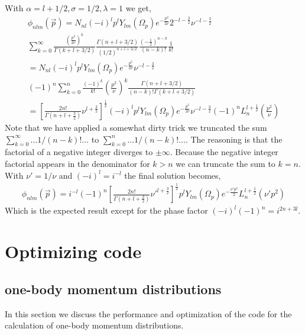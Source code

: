 \documentclass[10pt]{article}
\begin{document}
With $\alpha = l+1/2, \sigma = 1/2, \lambda = 1$ we get,
\begin{multline*}
	\phi_{n l m}(\vec{p}) = N_{nl} (-i)^{l} p^{l}  Y_{l m}(\Omega_p) e^{-\frac{p^{2}}{2 \nu}} 2^{-l-\frac{3}{2}} \nu^{-l-\frac{3}{2}} \\
	 \sum_{k=0}^{\infty}  \frac{\left( \frac{p^{2}}{2 \nu} \right)^{k}}{\Gamma(k+l+3/2)} \frac{\Gamma(n+l+3/2)}{(1/2)^{n+l+3/2}} \frac{\left(-\frac{1}{2}\right)^{n-k}}{(n-k)!} \frac{1}{k!} \\
	 = N_{nl} (-i)^{l} p^{l}  Y_{l m}(\Omega_p) e^{-\frac{p^{2}}{2 \nu}} \nu^{-l-\frac{3}{2}} \\
	 (-1)^{n} \sum_{k=0}^{n} \frac{(-1)^{k}}{k!} \left( \frac{p^{2}}{\nu} \right)^{k} \frac{\Gamma(n+l+3/2)}{(n-k)! \Gamma(k+l+3/2)} \\
	 = \left[ \frac{ 2n!}{\Gamma(n+l+\frac{3}{2})} \nu^{l+\frac{3}{2}} \right]^{\frac{1}{2}} (-i)^{l} p^{l}  Y_{l m}(\Omega_p) e^{-\frac{p^{2}}{2 \nu}} \nu^{-l-\frac{3}{2}} (-1)^{n} L_{n}^{l+\frac{1}{2}}(\frac{p^{2}}{\nu})
\end{multline*}
Note that we have applied a somewhat dirty trick we truncated the sum $\sum_{k=0}^{\infty} \ldots 1/(n-k)! \ldots$ to $ \sum_{k=0}^{n} \ldots 1/(n-k)! \ldots$. The reasoning is that the factorial of a negative integer diverges to $\pm \infty$. Because the negative integer factorial appears in the denominator for $k>n$ we can truncate the sum to $k=n$. With $\nu' = 1/\nu$ and $(-i)^{l}=i^{-l}$ the final solution becomes,
\begin{align*}
	\phi_{n l m}(\vec{p}) =  i^{-l} (-1)^{n} \left[ \frac{ 2n!}{\Gamma(n+l+\frac{3}{2})} \nu'^{l+\frac{3}{2}} \right]^{\frac{1}{2}} p^{l}  Y_{l m}(\Omega_p) e^{-\frac{\nu' p^{2}}{2}} L_{n}^{l+\frac{1}{2}}(\nu'p^{2})
\end{align*}
Which is the expected result except for the phase factor $(-i)^{l} (-1)^{n} = i^{2n+3l}$.



\section{Optimizing code}

\subsection{one-body momentum distributions}
In this section we discuss the performance and optimization of the code for the calculation of one-body momentum distributions.
\end{document}
